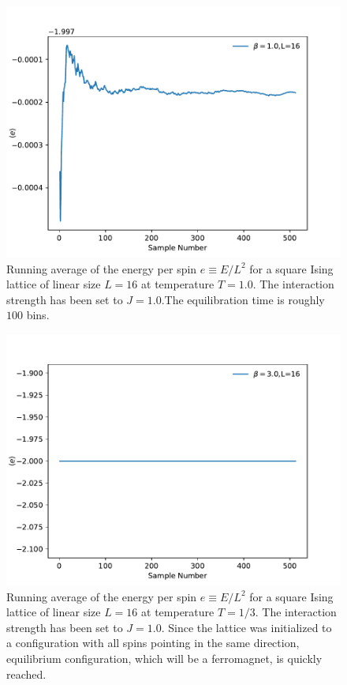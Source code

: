 \documentclass[12pt]{article}
\begin{document}
\begin{figure}[t]
\begin{center}
\includegraphics[width=0.7\columnwidth]{Figures/a_equilibration_beta_1.0}
\end{center}
\caption{Running average of the energy per spin $e \equiv E/L^2$ for a square Ising lattice of linear size $L=16$ at temperature $T=1.0$. The interaction strength has been set to $J=1.0$.The equilibration time is roughly $100$ bins. }
\label{fig:equilibration1}
\end{figure}

\begin{figure}[t]
\begin{center}
\includegraphics[width=0.7\columnwidth]{Figures/a_equilibration_beta_3.0}
\end{center}
\caption{Running average of the energy per spin $e \equiv E/L^2$ for a square Ising lattice of linear size $L=16$ at temperature $T=1/3$. The interaction strength has been set to $J=1.0$. Since the lattice was initialized to a configuration with all spins pointing in the same direction, equilibrium configuration, which will be a ferromagnet, is quickly reached.}
\label{fig:equilibration3}
\end{figure}
\end{document}
